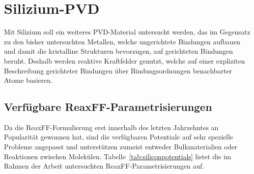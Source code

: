\section{Silizium-PVD}
\label{siliconpvd}

Mit Silizium soll ein weiteres PVD-Material untersucht werden, das im Gegensatz zu den bisher untersuchten Metallen, welche ungerichtete Bindungen aufbauen und damit die kristalline Strukturen bevorzugen, auf gerichteten Bindungen beruht.
Deshalb werden reaktive Kraftfelder genutzt, welche auf einer expliziten Beschreibung gerichteter Bindungen über Bindungsordnungen benachbarter Atome basieren.

\subsection{Verfügbare ReaxFF-Parametrisierungen}

Da die ReaxFF-Formulierung erst innerhalb des letzten Jahrzehntes an Popularität gewonnen hat, sind die verfügbaren Potentiale auf sehr spezielle Probleme angepasst und unterstützen zumeist entweder Bulkmaterialien oder Reaktionen zwischen Molekülen.
Tabelle~\ref{tab:siliconpotentials} listet die im Rahmen der Arbeit untersuchten ReaxFF-Parametrisierungen auf.


